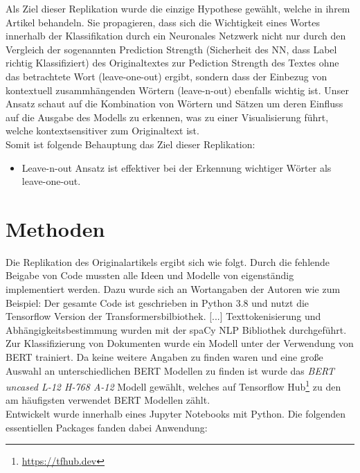 \documentclass[DIV=13,fontsize=11pt]{scrartcl}
\begin{document}
Als Ziel dieser Replikation wurde die einzige Hypothese gewählt, welche
\citeauthor{dunn2021context} in ihrem Artikel behandeln. Sie propagieren,
dass sich die Wichtigkeit eines Wortes innerhalb der Klassifikation durch ein
Neuronales Netzwerk nicht nur durch den Vergleich der sogenannten
Prediction Strength (Sicherheit des NN, dass Label richtig Klassifiziert)
des Originaltextes zur Pediction Strength des Textes ohne das betrachtete Wort (leave-one-out)
ergibt, sondern dass der Einbezug von kontextuell zusammhängenden Wörtern (leave-n-out)
ebenfalls wichtig ist. \glqq Unser Ansatz schaut auf die Kombination von
Wörtern und Sätzen um deren Einfluss auf die Ausgabe des Modells zu erkennen,
was zu einer Visualisierung führt, welche kontextsensitiver zum Originaltext ist.
\grqq~\cite{dunn2021context}\\

Somit ist folgende Behauptung das Ziel dieser Replikation:

\begin{itemize}
    \item Leave-n-out Ansatz ist effektiver bei der Erkennung wichtiger Wörter als leave-one-out.
\end{itemize}

\section{Methoden}

Die Replikation des Originalartikels ergibt sich wie folgt. Durch die
fehlende Beigabe von Code mussten alle Ideen und Modelle von \citeauthor{dunn2021context}
eigenständig implementiert werden. Dazu wurde sich an Wortangaben
der Autoren wie zum Beispiel:
\glqq Der gesamte Code ist geschrieben in Python 3.8 und nutzt die Tensorflow Version
der Transformersbilbiothek. [...] Texttokenisierung und Abhängigkeitsbestimmung wurden
mit der spaCy NLP Bibliothek durchgeführt.\grqq~\cite{dunn2021context}\\

Zur Klassifizierung von Dokumenten wurde ein Modell unter der Verwendung von BERT trainiert.
Da keine weitere Angaben zu finden waren und eine große Auswahl an unterschiedlichen
BERT Modellen zu finden ist wurde das \textit{BERT uncased L-12 H-768 A-12} Modell gewählt,
welches auf Tensorflow Hub\footnote{\url{https://tfhub.dev}} zu den am häufigsten verwendet
BERT Modellen zählt.\\

Entwickelt wurde innerhalb eines Jupyter Notebooks mit Python.
Die folgenden essentiellen Packages fanden dabei Anwendung:
\end{document}
